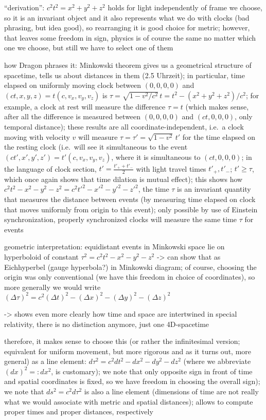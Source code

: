 \enquote{derivation}: $c^2 t^2 = x^2 + y^2 + z^2$ holds for light independently of frame we choose, so it is an invariant object and it also represents what we do with clocks (bad phrasing, but idea good), so rearranging it is good choice for metric; however, that leaves some freedom in sign, physics is of course the same no matter which one we choose, but still we have to select one of them


how Dragon phrases it: Minkowski theorem gives us a geometrical structure of spacetime, tells us about distances in them (2.5 Uhrzeit); in particular, time elapsed on uniformly moving clock between $(0, 0, 0, 0)$ and $(ct, x, y, z) = t (c, v_x, v_y, v_z)$ is $\tau = \sqrt{1 - v^2 / c^2} \, t = t^2 - (x^2 + y^2 + z^2) / c^2$; for example, a clock at rest will measure the difference $\tau = t$ (which makes sense, after all the difference is measured between $(0, 0, 0, 0)$ and $(ct, 0, 0, 0)$, only temporal distance); these results are all coordinate-independent, i.e.~a clock moving with velocity $v$ will measure $\tau = \tau' = \sqrt{1 - v^2} \, t'$ for the time elapsed on the resting clock (i.e.~will see it simultaneous to the event $(ct', x', y', z') = t' (c, v_x, v_y, v_z)$, where it is simultaneous to $(ct, 0, 0, 0)$; in the language of clock section, $t' = \frac{t'_+ + t'_-}{2}$ with light travel times $t'_+, t'_-$; $t' \geq \tau$, which once again shows that time dilation is mutual effect); this shows how $c^2 t^2 - x^2 - y^2 - z^2 = c^2 t'^2 - x'^2 - y'^2 - z'^2$, the time $\tau$ is an invariant quantity that measures the distance between events (by measuring time elapsed on clock that moves uniformly from origin to this event); only possible by use of Einstein synchronization, properly synchronized clocks will measure the same time $\tau$ for events



geometric interpretation: equidistant events in Minkowski space lie on hyperboloid of constant $\tau^2 = c^2 t^2 - x^2 - y^2 - z^2$ -> can show that as Eichhyperbel (gauge hyperbola?) in Minkowski diagram; of course, choosing the origin was only conventional (we have this freedom in choice of coordinates), so more generally we would write $(\Delta \tau)^2 = c^2 (\Delta t)^2 - (\Delta x)^2 - (\Delta y)^2 - (\Delta z)^2$

-> shows even more clearly how time and space are intertwined in special relativity, there is no distinction anymore, just one 4D-spacetime


therefore, it makes sense to choose this (or rather the infinitesimal version; equivalent for uniform movement, but more rigorous and as it turns out, more general) as a line element: $d\tau^2 = c^2 dt^2 - dx^2 - dy^2 - dz^2$ (where we abbreviate $(dx)^2 =: dx^2$, is customary); we note that only opposite sign in front of time and spatial coordinates is fixed, so we have freedom in choosing the overall sign); we note that $ds^2 = c^2 d\tau^2$ is also a line element (dimensions of time are not really what we would associate with metric and spatial distances); allows to compute proper times and proper distances, respectively


